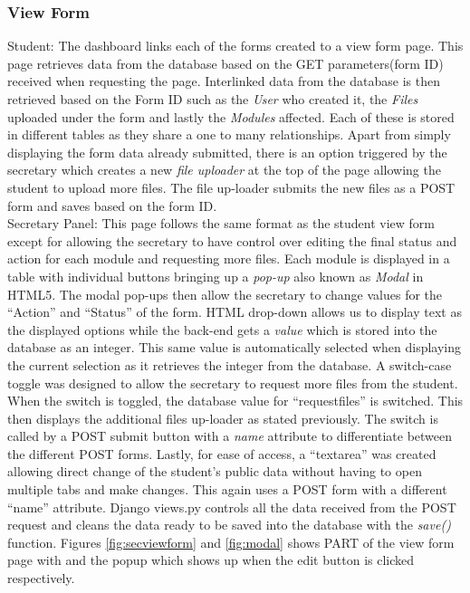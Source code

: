 \documentclass[../main.tex]{subfiles}
\begin{document}
\subsubsection{View Form} 

Student: The dashboard links each of the forms created to a view form page. This page retrieves data from the database based on the GET parameters(form ID) received when requesting the page. Interlinked data from the database is then retrieved based on the Form ID such as the \textit{User} who created it, the \textit{Files} uploaded under the form and lastly the \textit{Modules} affected. Each of these is stored in different tables as they share a one to many relationships. Apart from simply displaying the form data already submitted, there is an option triggered by the secretary which creates a new \textit{file uploader} at the top of the page allowing the student to upload more files. The file up-loader submits the new files as a POST form and saves based on the form ID. \\[4mm]

Secretary Panel: This page follows the same format as the student view form except for allowing the secretary to have control over editing the final status and action for each module and requesting more files. Each module is displayed in a table with individual buttons bringing up a \textit{pop-up} also known as \textit{Modal} in HTML5. The modal pop-ups then allow the secretary to change values for the \enquote{Action} and \enquote{Status} of the form. HTML drop-down allows us to display text as the displayed options while the back-end gets a \textit{value} which is stored into the database as an integer. This same value is automatically selected when displaying the current selection as it retrieves the integer from the database. A switch-case toggle was designed to allow the secretary to request more files from the student. When the switch is toggled, the database value for \enquote{requestfiles} is switched. This then displays the additional files up-loader as stated previously. The switch is called by a POST submit button with a \textit{name} attribute to differentiate between the different POST forms. Lastly, for ease of access, a \enquote{textarea} was created allowing direct change of the student's public data without having to open multiple tabs and make changes. This again uses a POST form with a different \enquote{name} attribute. Django views.py controls all the data received from the POST request and cleans the data ready to be saved into the database with the \textit{save()} function. Figures \ref{fig:secviewform} and \ref{fig:modal} shows PART of the view form page with and the popup which shows up when the edit button is clicked respectively.\\[4mm]
\end{document}
